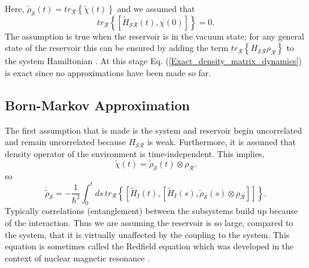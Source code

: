 Here, $\tilde{\rho}_{\mathcal{S}}(t) = tr_{\mathcal{R}}\left\lbrace \tilde{\chi} (t)\right\rbrace$ and we assumed that
\begin{equation}\label{Traceless_assumption}
tr_{\mathcal{R}}  \left\lbrace [ \tilde{H}_{\mathcal{SR}} (t), \chi(0) ] \right\rbrace = 0.
\end{equation} 
The assumption is true when the reservoir is in the vacuum state; for any general state of the reservoir this can be ensured by adding the term $tr_{\mathcal{R}} \left\lbrace H_{\mathcal{SR}} \rho_{\mathcal{R}} \right\rbrace$ to the system Hamiltonian \cite{StatMethQOI}. At this stage Eq. (\ref{Exact_density_matrix_dynamics}) is exact since no approximations have been made so far.
%
\subsection{Born-Markov Approximation}
%
The first assumption that is made is the system and reservoir begin uncorrelated and remain uncorrelated because $H_{\mathcal{SR}}$ is weak. Furthermore, it is assumed that density operator of the environment is time-independent. This implies,
%
\begin{equation}
\tilde{\chi}(t) = \tilde{\rho}_{\mathcal{S}}(t) \otimes \rho_{\mathcal{R}}. 
\end{equation}
so
\begin{equation}\label{non_markovian_master_equation}
\dot{\tilde{\rho}}_{\mathcal{S}} =  - \frac{1}{\hbar^2} \int_0^t ds \,  tr_{\mathcal{R}} \left\lbrace [\tilde{H}_I(t), [\tilde{H}_I(s), \tilde{\rho}_{\mathcal{S}}(s) \otimes \rho_{\mathcal{R}}]] \right\rbrace.
\end{equation}
Typically correlations (entanglement) between the subsystems build up because of the interaction. Thus we are assuming the reservoir is so large, compared to the system, that it is virtually unaffected by the coupling to the system. This equation is sometimes called the Redfield equation which was developed in the context of nuclear magnetic resonance \cite{IBM}. %




